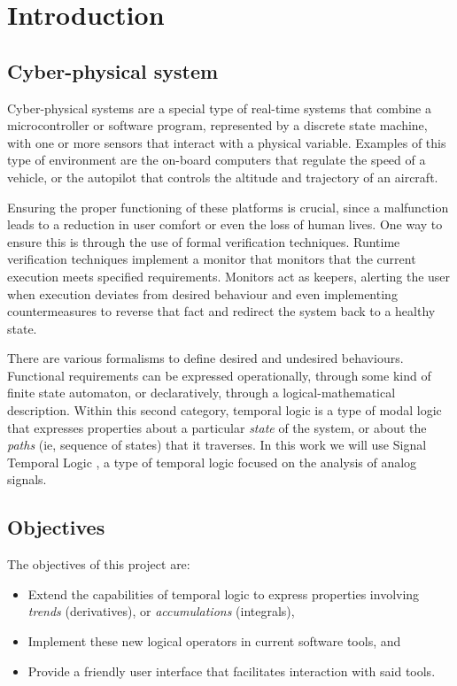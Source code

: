\chapter{Introduction}

\section{Cyber-physical system}
Cyber-physical systems are a special type of real-time systems that combine a microcontroller or software program, represented by a discrete state machine, with one or more sensors that interact with a physical variable. Examples of this type of environment are the on-board computers that regulate the speed of a vehicle, or the autopilot that controls the altitude and trajectory of an aircraft.

Ensuring the proper functioning of these platforms is crucial, since a malfunction leads to a reduction in user comfort or even the loss of human lives. One way to ensure this is through the use of formal verification techniques. Runtime verification techniques \cite{STTT_RV_21} implement a monitor that monitors that the current execution meets specified requirements. Monitors act as keepers, alerting the user when execution deviates from desired behaviour and even implementing countermeasures to reverse that fact and redirect the system back to a healthy state.

There are various formalisms to define desired and undesired behaviours. Functional requirements can be expressed operationally, through some kind of finite state automaton, or declaratively, through a logical-mathematical description. Within this second category, temporal logic is a type of modal logic that expresses properties about a particular \emph{state} of the system, or about the \emph{paths} (ie, sequence of states) that it traverses. In this work we will use Signal Temporal Logic \cite{STL}, a type of temporal logic focused on the analysis of analog signals.

\section{Objectives}

The objectives of this project are:

\begin{itemize}
\item Extend the capabilities of temporal logic to express properties involving \textit{trends} (derivatives), or \textit{accumulations} (integrals), 
\item Implement these new logical operators in current software tools, and
\item Provide a friendly user interface that facilitates interaction with said tools.
\end{itemize}


